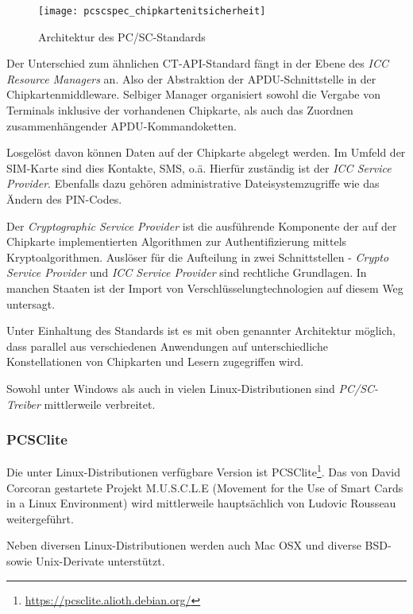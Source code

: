  \begin{figure}[htp]
  \begin{center}
   \texttt{[image: pcscspec\_chipkartenitsicherheit]}
  \end{center}
  \caption[Architektur des PC/SC-Standards]{Architektur des PC/SC-Standards \cite{spitz11}}
  \label{abb:architektur_pcsc}
 \end{figure}

Der Unterschied zum ähnlichen CT-API-Standard fängt in der Ebene
des \textit{ICC Resource Managers} an. Also der Abstraktion der
APDU-Schnittstelle in der Chipkartenmiddleware.\cite{spitz11}
Selbiger Manager organisiert sowohl die Vergabe von Terminals inklusive
der vorhandenen Chipkarte, als auch das Zuordnen zusammenhängender
APDU-Kommandoketten.

Losgelöst davon können Daten auf der Chipkarte abgelegt werden. Im Umfeld
der SIM-Karte sind dies Kontakte, SMS, o.ä. Hierfür zuständig ist der
\textit{ICC Service Provider}. Ebenfalls dazu gehören administrative Dateisystemzugriffe
wie das Ändern des PIN-Codes.

Der \textit{Cryptographic Service Provider} ist die ausführende Komponente
der auf der Chipkarte implementierten Algorithmen zur Authentifizierung mittels
Kryptoalgorithmen. Auslöser für die Aufteilung in zwei Schnittstellen -
\textit{Crypto Service Provider} und \textit{ICC Service Provider} sind
rechtliche Grundlagen. In manchen Staaten ist der Import von
Verschlüsselungtechnologien auf diesem Weg untersagt.

Unter Einhaltung des Standards ist es mit oben genannter Architektur möglich,
dass parallel aus verschiedenen Anwendungen auf unterschiedliche Konstellationen
von Chipkarten und Lesern zugegriffen wird.

Sowohl unter Windows als auch in vielen Linux-Distributionen sind
\textit{PC/SC-Treiber} mittlerweile verbreitet.

\subsubsection{PCSClite}
Die unter Linux-Distributionen verfügbare Version ist
PCSClite\footnote{\url{https://pcsclite.alioth.debian.org/}}.
Das von David Corcoran gestartete Projekt M.U.S.C.L.E
(Movement for the Use of Smart Cards in a Linux Environment)
wird mittlerweile hauptsächlich von Ludovic Rousseau
weitergeführt\cite{pcscliteweb}.

Neben diversen Linux-Distributionen werden auch Mac OSX und diverse
BSD- sowie Unix-Derivate unterstützt.

